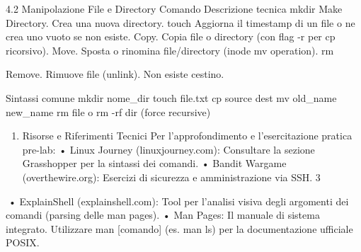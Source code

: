\documentclass[11pt,a4paper]{article}
\providecommand{\tightlist}{%
  \setlength{\itemsep}{0pt}\setlength{\parskip}{0pt}}
\begin{document}
4.2 Manipolazione File e Directory Comando Descrizione tecnica mkdir
Make Directory. Crea una nuova directory. touch Aggiorna il timestamp di
un file o ne crea uno vuoto se non esiste. Copy. Copia file o directory
(con flag -r per cp ricorsivo). Move. Sposta o rinomina file/directory
(inode mv operation). rm

Remove. Rimuove file (unlink). Non esiste cestino.

Sintassi comune mkdir nome\_dir touch file.txt cp source dest mv
old\_name new\_name rm file o rm -rf dir (force recursive)

\begin{enumerate}
\def\labelenumi{\arabic{enumi}.}
\setcounter{enumi}{4}
\tightlist
\item
  Risorse e Riferimenti Tecnici Per l'approfondimento e l'esercitazione
  pratica pre-lab: • Linux Journey (linuxjourney.com): Consultare la
  sezione Grasshopper per la sintassi dei comandi. • Bandit Wargame
  (overthewire.org): Esercizi di sicurezza e amministrazione via SSH. 3
\end{enumerate}

• ExplainShell (explainshell.com): Tool per l'analisi visiva degli
argomenti dei comandi (parsing delle man pages). • Man Pages: Il manuale
di sistema integrato. Utilizzare man {[}comando{]} (es. man ls) per la
documentazione ufficiale POSIX.


\end{document}
